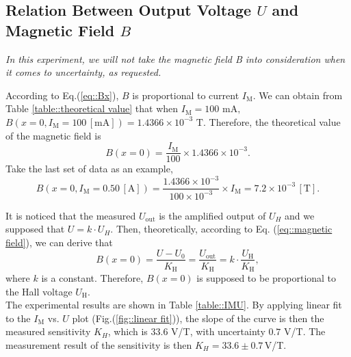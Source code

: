 \documentclass[a4paper]{article}
\begin{document}
\subsection{Relation Between Output Voltage $U$ and Magnetic Field $B$}\label{sec::e2}

\textit{In this experiment, we will not take the magnetic field B into consideration when it comes to uncertainty, as requested.}

According to Eq.(\ref{eq::Bx}), $B$ is proportional to current $I_\text{M}$. We can obtain from Table \ref{table::theoretical value} that when $I_\text{M} = 100 \,\,\text{mA},$ $B(x=0,I_\text{M}=100\,[\text{mA}])=1.4366\times10^{-3}\,\,\text{T}.$ Therefore,
the theoretical value of the magnetic field is $$B(x=0) = \frac{I_\text{M}}{100}\times 1.4366\times10^{-3}.$$
Take the last set of data as an example,
$$B(x=0,I_\text{M}=0.50\,[\text{A}]) = \frac{1.4366\times10^{-3}}{100\times 10^{-3}}\times I_\text{M} = 7.2\times 10^{-3}\,[\text{T}].$$

It is noticed that the measured $U_{\text{out}}$ is the amplified output of $U_{H}$ and we supposed that $U = k \cdot U_{H}$. Then, theoretically, according to Eq. (\ref{eq::magnetic field}), we can derive that
$$B(x=0) = \frac{U-U_0}{K_\text{H}} = \frac{U_{\text{out}}}{K_\text{H}} = k\cdot\frac{U_\text{H}}{K_\text{H}},$$
where $k$ is a constant. Therefore, $B(x=0)$ is supposed to be proportional to the Hall voltage $U_\text{H}$.\\

The experimental results are shown in Table \ref{table::IMU}. By applying linear fit to the $I_\text{M}$ vs. $U$ plot (Fig.(\ref{fig::linear fit})), the slope of the curve
is then the measured sensitivity $K_{H}$, which is $33.6$ V/T, with uncertainty $0.7$ V/T. The measurement result of the sensitivity is then
$K_H = 33.6 \pm 0.7\,$V/T.
\end{document}
